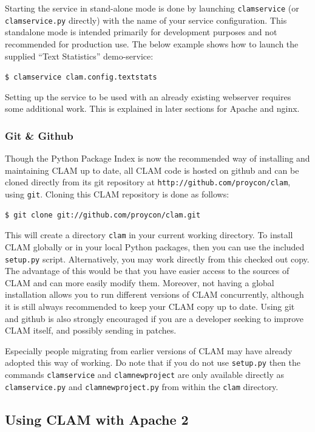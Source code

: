 \documentclass[a4paper,12pt]{report}
\begin{document}
Starting the service in stand-alone mode is done by launching
\texttt{clamservice} (or \texttt{clamservice.py} directly) with the name of your service
configuration. This standalone mode is intended primarily for development
purposes and not recommended for production use. The below example shows how to
launch the supplied ``Text Statistics'' demo-service:

\texttt{\$ clamservice clam.config.textstats}

Setting up the service to be used with an already existing webserver requires
some additional work. This is explained in later sections for Apache and nginx.

\subsubsection{Git \& Github}

Though the Python Package Index is now the recommended way of installing and
maintaining CLAM up to date, all CLAM code is hosted on github and can be
cloned directly from its git repository at
\texttt{http://github.com/proycon/clam}, using \texttt{git}. Cloning this CLAM
repository is done as follows:

\begin{verbatim}
$ git clone git://github.com/proycon/clam.git
\end{verbatim}
 
This will create a directory \texttt{clam} in your current working directory.
To install CLAM globally or in your local Python packages, then you can use the
included \texttt{setup.py} script. Alternatively, you may work directly from
this checked out copy. The advantage of this would be that you have easier
access to the sources of CLAM and can more easily modify them. Moreover, not
having a global installation allows you to run different versions of CLAM
concurrently, although it is still always recommended to keep your CLAM copy up
to date. Using git and github is also strongly encouraged if you are a
developer seeking to improve CLAM itself, and possibly sending in patches.

Especially people migrating from earlier versions of CLAM may have already
adopted this way of working. Do note that if you do not use \texttt{setup.py}
then the commands \texttt{clamservice} and \texttt{clamnewproject} are only
available directly as \texttt{clamservice.py} and \texttt{clamnewproject.py}
from within the \texttt{clam} directory. 

\subsection{Using CLAM with Apache 2}
\end{document}
